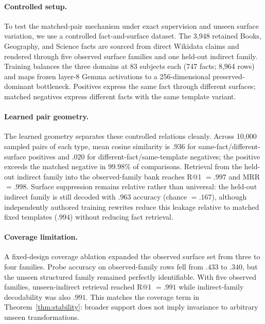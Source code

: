 \documentclass[11pt]{article}
\begin{document}
\paragraph{Controlled setup.}
To test the matched-pair mechanism under exact supervision and unseen surface variation, we use a controlled fact-and-surface dataset. The 3,948 retained Books, Geography, and Science facts are sourced from direct Wikidata claims \citep{vrandecic2014wikidata} and rendered through five observed surface families and one held-out indirect family. Training balances the three domains at 83 subjects each (747 facts; 8,964 rows) and maps frozen layer-8 Gemma activations to a 256-dimensional preserved-dominant bottleneck. Positives express the same fact through different surfaces; matched negatives express different facts with the same template variant.

\paragraph{Learned pair geometry.}
The learned geometry separates these controlled relations cleanly. Across 10,000 sampled pairs of each type, mean cosine similarity is $.936$ for same-fact/different-surface positives and $.020$ for different-fact/same-template negatives; the positive exceeds the matched negative in $99.98\%$ of comparisons. Retrieval from the held-out indirect family into the observed-family bank reaches R@1 $=.997$ and MRR $=.998$. Surface suppression remains relative rather than universal: the held-out indirect family is still decoded with $.963$ accuracy (chance $=.167$), although independently authored training rewrites reduce this leakage relative to matched fixed templates ($.994$) without reducing fact retrieval.

\paragraph{Coverage limitation.}
A fixed-design coverage ablation expanded the observed surface set from three to four families. Probe accuracy on observed-family rows fell from $.433$ to $.340$, but the unseen structured family remained perfectly identifiable. With five observed families, unseen-indirect retrieval reached R@1 $=.991$ while indirect-family decodability was also $.991$. This matches the coverage term in Theorem~\ref{thm:stability}: broader support does not imply invariance to arbitrary unseen transformations.
\end{document}
